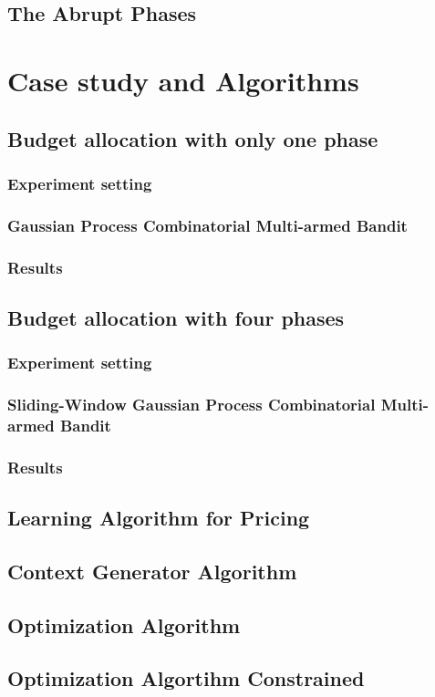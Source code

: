 \documentclass[12pt]{article}
\begin{document}
	\subsection{The Abrupt Phases}
	
	\section{Case study and Algorithms}
	
	\subsection{Budget allocation with only one phase}
	
	\subsubsection{Experiment setting}
	
	\subsubsection{Gaussian Process Combinatorial Multi-armed Bandit}
	
	\subsubsection{Results}
	
	
	\subsection{Budget allocation with four phases}
	
	\subsubsection{Experiment setting}
	
	\subsubsection{Sliding-Window Gaussian Process Combinatorial Multi-armed Bandit}
	
	\subsubsection{Results}
	
	
	\subsection{Learning Algorithm for Pricing}
	
	
	\subsection{Context Generator Algorithm}
	\subsection{Optimization Algorithm}
	\subsection{Optimization Algortihm Constrained}
	
\end{document}
